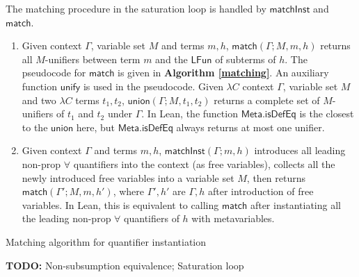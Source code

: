 \noindent The matching procedure in the saturation loop is handled by $\mathsf{matchInst}$ and $\mathsf{match}$.
\begin{enumerate}
  \item Given context $\Gamma$, variable set $M$ and terms $m, h$,
    $\mathsf{match}(\Gamma; M, m, h)$ returns all $M$-unifiers between term $m$ and the $\mathsf{LFun}$ of subterms of $h$.
    The pseudocode for $\mathsf{match}$ is given in \textbf{Algorithm \ref{matching}}. An auxiliary function
    $\mathsf{unify}$ is used in the pseudocode. Given $\lambda C$ context $\Gamma$, variable set $M$
    and two $\lambda C$ terms $t_1, t_2$, $\mathsf{union}(\Gamma; M, t_1, t_2)$ returns a complete set of
    $M$-unifiers of $t_1$ and $t_2$ under $\Gamma$. In Lean, the function $\mathsf{Meta.isDefEq}$ is the closest
    to the $\mathsf{union}$ here, but $\mathsf{Meta.isDefEq}$ always returns at most one unifier.
  \item Given context $\Gamma$ and terms $m, h$,
    $\mathsf{matchInst}(\Gamma; m, h)$ introduces all leading non-prop $\forall$ quantifiers into the context
    (as free variables), collects all the newly introduced free variables into a variable set $M$, then returns
    $\mathsf{match}(\Gamma'; M, m, h')$, where $\Gamma', h'$ are $\Gamma, h$ after introduction of free variables.
    In Lean, this is equivalent to calling $\mathsf{match}$ after instantiating all the leading non-prop
    $\forall$ quantifiers of $h$ with metavariables.
\end{enumerate}

\begin{algorithm}\label{matching}
  \DontPrintSemicolon
  \SetNoFillComment
  \caption{Matching algorithm for quantifier instantiation}
\end{algorithm}

\noindent \textbf{TODO:} Non-subsumption equivalence; Saturation loop